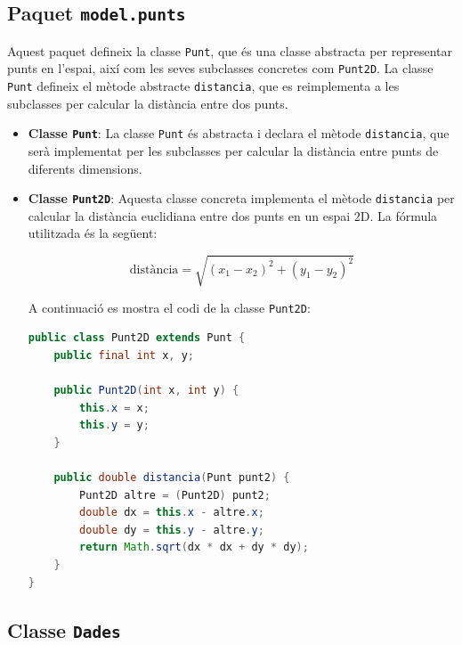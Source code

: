 \documentclass{ieeetj}
\begin{document}
\subsection{Paquet \texttt{model.punts}}

Aquest paquet defineix la classe \texttt{Punt}, que és una classe abstracta per representar punts en l'espai, així com les seves subclasses concretes com \texttt{Punt2D}. La classe \texttt{Punt} defineix el mètode abstracte \texttt{distancia}, que es reimplementa a les subclasses per calcular la distància entre dos punts.

\begin{itemize} \item \textbf{Classe \texttt{Punt}}: La classe \texttt{Punt} és abstracta i declara el mètode \texttt{distancia}, que serà implementat per les subclasses per calcular la distància entre punts de diferents dimensions.

\item \textbf{Classe \texttt{Punt2D}}: Aquesta classe concreta implementa el mètode \texttt{distancia} per calcular la distància euclidiana entre dos punts en un espai 2D. La fórmula utilitzada és la següent:

\[
\text{distància} = \sqrt{(x_1 - x_2)^2 + (y_1 - y_2)^2}
\]

A continuació es mostra el codi de la classe \texttt{Punt2D}:

\begin{lstlisting}[language=java]
public class Punt2D extends Punt {
    public final int x, y;

    public Punt2D(int x, int y) {
        this.x = x;
        this.y = y;
    }

    public double distancia(Punt punt2) {
        Punt2D altre = (Punt2D) punt2;
        double dx = this.x - altre.x;
        double dy = this.y - altre.y;
        return Math.sqrt(dx * dx + dy * dy);
    }
}
\end{lstlisting}


\end{itemize}

\subsection{Classe \texttt{Dades}}
\end{document}
